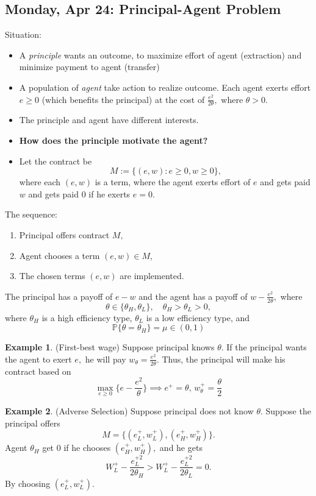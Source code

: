 \documentclass[10pt, oneside]{article}
\newcommand{\bbP}{\mathbb{P}}
\theoremstyle{definition}
\newtheorem{exmp}{Example}[section]
\begin{document}
\subsection{Monday, Apr 24: Principal-Agent Problem}
Situation:
\begin{itemize}
    \item A \textit{principle} wants an outcome, to maximize effort of agent (extraction) and minimize payment to agent (transfer)
    \item A population of \textit{agent} take action to realize outcome. Each agent exerts effort $e \geq 0$ (which benefits the principal) at the cost of $\frac{e^2}{2\theta},$ where $\theta >0.$
    \item The principle and agent have different interests.
    \item \textbf{How does the principle motivate the agent?}
    \item Let the contract be 
    \[M:= \{(e,w) : e\geq 0, w \geq 0\},\] where each $(e,w)$ is a term, where the agent exerts effort of $e$ and gets paid $w$ and gets paid $0$ if he exerts $e = 0.$ 
\end{itemize}
The sequence: 
\begin{enumerate}
    \item Principal offers contract $M,$
    \item Agent chooses a term $(e, w) \in M$,
    \item The chosen terms $(e,w)$ are implemented.
\end{enumerate}
The principal has a payoff of $e-w$ and the agent has a payoff of $w - \frac{e^2}{2\theta},$ where 
\[\theta \in \{\theta_H, \theta_L\}, \quad \theta_H > \theta_L >0,\] where $\theta_H$ is a high efficiency type, $\theta_L$ is a low efficiency type, and 
\[\bbP\{\theta = \theta_H\} = \mu \in (0,1)\]
\begin{exmp}
    (First-best wage) Suppose principal knows $\theta.$ If the principal wants the agent to exert $e,$ he will pay $w_\theta = \frac{e^2}{2\theta}.$ Thus, the principal will make his contract based on 
    \[\max_{e \geq 0}\{e - \frac{e^2}{\theta}\} \implies e^+ = \theta , \, w^+_\theta = \frac{\theta}{2}\]
\end{exmp}

\begin{exmp}
    (Adverse Selection) Suppose principal does not know $\theta.$ Suppose the principal offers 
    \[M = \{(e_L^+, w_L^+), (e_H^+, w_H^+)\}.\] Agent $\theta_H$ get $0$ if he chooses $(e_H^+, w_H^+),$ and he gets 
    \[W_L^+ - \frac{e_L^{+2}}{2\theta_H} > W_L^+ - \frac{e_L^{+2}}{2\theta_L} = 0.\] By choosing $(e_L^+, w_L^+).$
\end{exmp}
\end{document}
